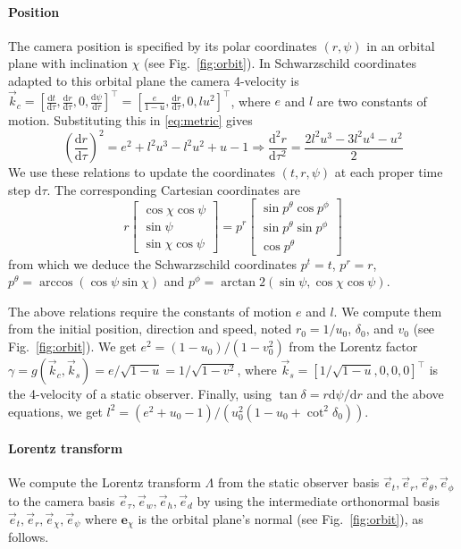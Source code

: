 \documentclass{document}
\newcommand{\diff}{\mathrm d}
\begin{document}
\paragraph*{Position} The camera position is specified by its polar coordinates 
$(r,\psi)$ in an orbital plane with inclination $\chi$ (see 
Fig.~\ref{fig:orbit}). In Schwarzschild coordinates adapted to this orbital 
plane the camera 4-velocity is $\vec{k}_c = [\frac{\diff t}{\diff \tau}, 
\frac{\diff r}{\diff \tau}, 0, \frac{\diff \psi}{\diff \tau}]^\top = 
[\frac{e}{1 - u}, \frac{\diff r}{\diff \tau}, 0, l u^2]^\top$, where $e$ and 
$l$ are two constants of motion. Substituting this in \eqref{eq:metric} gives
\begin{equation*}
\left(\frac{\diff r}{\diff \tau}\right)^2 = e^2 + l^2 u^3 - l^2 u^2 + u - 1
\Rightarrow
\frac{\diff^2 r}{\diff \tau^2} = \frac{2 l^2 u^3 - 3 l^2 u^4 - u^2}{2}
\end{equation*}
We use these relations to update the coordinates $(t, r, \psi)$ at each proper 
time step $\diff \tau$. The corresponding Cartesian coordinates are
\begin{equation*}
r
\begin{bmatrix}
\cos\chi \cos\psi \\
\sin\psi\\
\sin\chi \cos\psi
\end{bmatrix}
=
p^r
\begin{bmatrix}
\sin p^\theta \cos p^\phi\\
\sin p^\theta \sin p^\phi\\
\cos p^\theta
\end{bmatrix}
\end{equation*}
from which we deduce the Schwarzschild coordinates $p^t = t $, $p^r = r$,
$p^\theta = \arccos(\cos\psi \sin\chi)$ and $p^\phi = \arctan2(\sin\psi, 
\cos\chi \cos\psi)$.

The above relations require the constants of motion $e$ and $l$. We compute 
them from the initial position, direction and speed, noted $r_0 = 1 / u_0$, 
$\delta_0$, and $v_0$ (see Fig.~\ref{fig:orbit}). We get $e^2 = (1 - u_0) / (1 
- v_0^2)$ from the Lorentz factor $\gamma = g(\vec{k}_c, \vec{k}_s) = 
e / \sqrt{1 - u} = 1 / \sqrt{1 - v^2}$, where $\vec{k}_s = [1 / \sqrt{1 
- u}, 0, 0, 0]^\top$ is the 4-velocity of a static observer. Finally, using 
$\tan\delta = r \diff\psi / \diff r$ and the above equations, we get $l^2 = 
(e^2 + u_0 - 1) / (u_0^2 (1 - u_0 + \cot^2\delta_0))$.

\paragraph*{Lorentz transform} We compute the Lorentz transform $\Lambda$ from 
the static observer basis $\vec{e}_t, \vec{e}_r, \vec{e}_\theta, 
\vec{e}_\phi$ to the camera basis $\vec{e}_\tau, \vec{e}_w, \vec{e}_h, 
\vec{e}_d$ by using the intermediate orthonormal basis $\vec{e}_t, \vec{e}_r, 
\vec{e}_\chi, \vec{e}_\psi$ where $\mathbf{e}_\chi$ is the orbital plane's 
normal (see Fig.~\ref{fig:orbit}), as follows.
\end{document}

